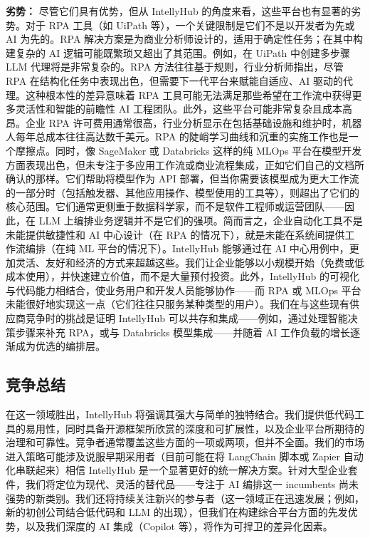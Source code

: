 \documentclass[11pt, a4paper, oneside]{article}
\begin{document}
\textbf{劣势：} 尽管它们具有优势，但从 IntellyHub 的角度来看，这些平台也有显著的劣势。对于 RPA 工具（如 UiPath 等），一个关键限制是它们不是以开发者为先或 AI 为先的。RPA 解决方案是为商业分析师设计的，适用于确定性任务；在其中构建复杂的 AI 逻辑可能既繁琐又超出了其范围。例如，在 UiPath 中创建多步骤 LLM 代理将是非常复杂的。RPA 方法往往基于规则，行业分析师指出，尽管 RPA 在结构化任务中表现出色，但需要下一代平台来赋能自适应、AI 驱动的代理\cite{forresterRPAvsAI}。这种根本性的差异意味着 RPA 工具可能无法满足那些希望在工作流中获得更多灵活性和智能的前瞻性 AI 工程团队。此外，这些平台可能非常复杂且成本高昂。企业 RPA 许可费用通常很高，行业分析显示在包括基础设施和维护时，机器人每年总成本往往高达数千美元。RPA 的陡峭学习曲线和沉重的实施工作也是一个摩擦点。同时，像 SageMaker 或 Databricks 这样的纯 MLOps 平台在模型开发方面表现出色，但未专注于多应用工作流或商业流程集成，正如它们自己的文档所确认的那样\cite{awsSagemaker}。它们帮助将模型作为 API 部署，但当你需要该模型成为更大工作流的一部分时（包括触发器、其他应用操作、模型使用的工具等），则超出了它们的核心范围。它们通常更侧重于数据科学家，而不是软件工程师或运营团队——因此，在 LLM 上编排业务逻辑并不是它们的强项。简而言之，企业自动化工具不是未能提供敏捷性和 AI 中心设计（在 RPA 的情况下），就是未能在系统间提供工作流编排（在纯 ML 平台的情况下）。IntellyHub 能够通过在 AI 中心用例中，更加灵活、友好和经济的方式来超越这些。我们让企业能够以小规模开始（免费或低成本使用），并快速建立价值，而不是大量预付投资。此外，IntellyHub 的可视化与代码能力相结合，使业务用户和开发人员能够协作——而 RPA 或 MLOps 平台未能很好地实现这一点（它们往往只服务某种类型的用户）。我们在与这些现有供应商竞争时的挑战是证明 IntellyHub 可以共存和集成——例如，通过处理智能决策步骤来补充 RPA，或与 Databricks 模型集成——并随着 AI 工作负载的增长逐渐成为优选的编排层。

\subsection{竞争总结}
在这一领域胜出，IntellyHub 将强调其强大与简单的独特结合。我们提供低代码工具的易用性，同时具备开源框架所欣赏的深度和可扩展性，以及企业平台所期待的治理和可靠性。竞争者通常覆盖这些方面的一项或两项，但并不全面。我们的市场进入策略可能涉及说服早期采用者（目前可能在将 LangChain 脚本或 Zapier 自动化串联起来）相信 IntellyHub 是一个显著更好的统一解决方案。针对大型企业套件，我们将定位为现代、灵活的替代品——专注于 AI 编排这一 incumbents 尚未强势的新类别。我们还将持续关注新兴的参与者（这一领域正在迅速发展；例如，新的初创公司结合低代码和 LLM 的出现），但我们在构建综合平台方面的先发优势，以及我们深度的 AI 集成（Copilot 等），将作为可捍卫的差异化因素。
\end{document}
